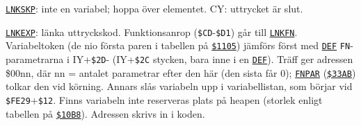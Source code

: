 \begin{Listing}
\Gap
{}
\Gap
{}
\Gap
{}
\Gap
\begin{Cmt}\par\noindent \hyperlink{l:LNKSKP}{\texttt{LNKSKP}}: inte en variabel; hoppa över elementet. CY: uttrycket är slut.\par\end{Cmt}
\Gap
\begin{Cmt}\par\noindent \hyperlink{l:LNKEXP}{\texttt{LNKEXP}}: länka uttryckskod. Funktionsanrop (\texttt{\$CD}-\texttt{\$D1}) går till \hyperlink{l:LNKFN}{\texttt{LNKFN}}. Variabeltoken (de nio första paren i tabellen på \hyperlink{a:1105}{\texttt{\$1105}}) jämförs först med \hyperlink{l:DEF}{\texttt{DEF}} \texttt{FN}-parametrarna i IY+\texttt{\$2D}- (IY+\texttt{\$2C} stycken, bara inne i en \hyperlink{l:DEF}{\texttt{DEF}}). Träff ger adressen \$00nn, där nn = antalet parametrar efter den här (den sista får 0); \hyperlink{l:FNPAR}{\texttt{FNPAR}} (\hyperlink{a:33AB}{\texttt{\$33AB}}) tolkar den vid körning. Annars slås variabeln upp i variabellistan, som börjar vid \texttt{\$FE29}+\texttt{\$12}. Finns variabeln inte reserveras plats på heapen (storlek enligt tabellen på \hyperlink{a:10B8}{\texttt{\$10B8}}). Adressen skrivs in i koden.\par\end{Cmt}

\end{Listing}
